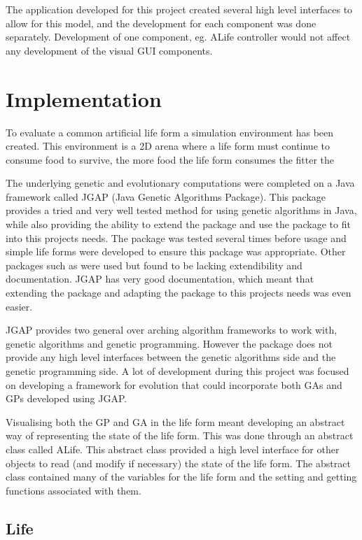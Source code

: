\documentclass[12pt]{article}
\begin{document}
The application developed for this project created several high level interfaces to allow for this model, and the development for each
component was done separately. Development of one component, eg. ALife controller would not affect any development of the visual 
GUI components.

\section{Implementation}
To evaluate a common artificial life form a simulation environment has been created.
This environment is a 2D arena where a life form must continue to consume food to survive, the more food the life form consumes the fitter the  

The underlying genetic and evolutionary computations were completed on a Java framework called JGAP (Java Genetic Algorithms Package).
This package provides a tried and very well tested method for using genetic algorithms in Java, while also providing the 
ability to extend the package and use the package to fit into this projects needs. The package was tested several times before usage
and simple life forms were developed to ensure this package was appropriate. Other packages such as %
were used but found to be lacking extendibility and documentation. JGAP has very good documentation, which meant that extending
the package and adapting the package to this projects needs was even easier.

JGAP provides two general over arching algorithm frameworks to work with, genetic algorithms and genetic programming. However
the package does not provide any high level interfaces between the genetic algorithms side and the genetic programming side. A 
lot of development during this project was focused on developing a framework for evolution that could incorporate both GAs and GPs developed
using JGAP. 

Visualising both the GP and GA in the life form meant developing an abstract way of representing the state of the life form. This was done
through an abstract class called ALife. This abstract class provided a high level interface for other objects to read (and modify if necessary)
the state of the life form. The abstract class contained many of the variables for the life form and the setting and getting functions 
associated with them. 

\subsection{Life}
\end{document}
